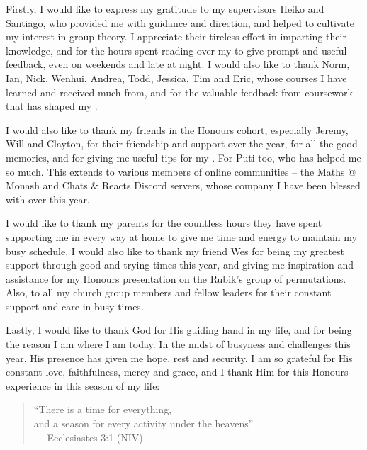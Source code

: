 Firstly, I would like to express my gratitude to my supervisors Heiko and Santiago, who provided me with guidance and direction, and helped to cultivate my interest in group theory. I appreciate their tireless effort in imparting their knowledge, and for the hours spent reading over my \thesis{} to give prompt and useful feedback, even on weekends and late at night. I would also like to thank Norm, Ian, Nick, Wenhui, Andrea, Todd, Jessica, Tim and Eric, whose courses I have learned and received much from, and for the valuable feedback from coursework that has shaped my \thesis{}.

I would also like to thank my friends in the Honours cohort, especially Jeremy, Will and Clayton, for their friendship and support over the year, for all the good memories, and for giving me useful tips for my \thesis{}. For Puti too, who has helped me so much. This extends to various members of online communities -- the Maths @ Monash and Chats \& Reacts Discord servers, whose company I have been blessed with over this year.

I would like to thank my parents for the countless hours they have spent supporting me in every way at home to give me time and energy to maintain my busy schedule. I would also like to thank my friend Wes for being my greatest support through good and trying times this year, and giving me inspiration and assistance for my Honours presentation on the Rubik's group of permutations. Also, to all my church group members and fellow leaders for their constant support and care in busy times.

Lastly, I would like to thank God for His guiding hand in my life, and for being the reason I am where I am today. In the midst of busyness and challenges this year, His presence has given me hope, rest and security. I am so grateful for His constant love, faithfulness, mercy and grace, and I thank Him for this Honours experience in this season of my life:

\begin{quote}
    ``There is a time for everything, \\
    \hspace*{15pt} and a season for every activity under the heavens'' \\
    \null\hfill --- Ecclesiastes 3:1 (NIV)
\end{quote}